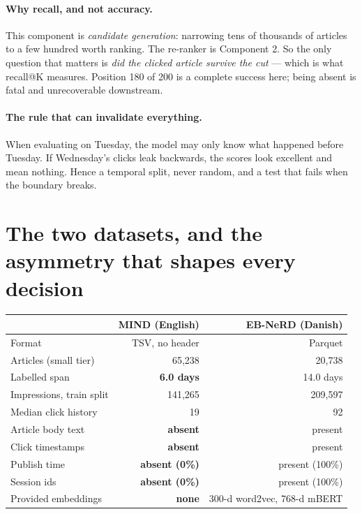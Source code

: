 \documentclass[11pt,a4paper]{article}
\begin{document}
\paragraph{Why recall, and not accuracy.}
This component is \emph{candidate generation}: narrowing tens of thousands of articles to a few
hundred worth ranking. The re-ranker is Component 2. So the only question that matters is
\emph{did the clicked article survive the cut} --- which is what recall@K measures. Position 180
of 200 is a complete success here; being absent is fatal and unrecoverable downstream.

\paragraph{The rule that can invalidate everything.}
When evaluating on Tuesday, the model may only know what happened before Tuesday. If Wednesday's
clicks leak backwards, the scores look excellent and mean nothing. Hence a temporal split, never
random, and a test that fails when the boundary breaks.

\section{The two datasets, and the asymmetry that shapes every decision}

\begin{center}
\begin{tabular}{lrr}
\toprule
 & \textbf{MIND} (English) & \textbf{EB-NeRD} (Danish) \\
\midrule
Format & TSV, no header & Parquet \\
Articles (small tier) & 65,238 & 20,738 \\
Labelled span & \textbf{6.0 days} & 14.0 days \\
Impressions, train split & 141,265 & 209,597 \\
Median click history & 19 & 92 \\
Article body text & \textbf{absent} & present \\
Click timestamps & \textbf{absent} & present \\
Publish time & \textbf{absent (0\%)} & present (100\%) \\
Session ids & \textbf{absent (0\%)} & present (100\%) \\
Provided embeddings & \textbf{none} & 300-d word2vec, 768-d mBERT \\
\bottomrule
\end{tabular}
\end{center}
\end{document}
